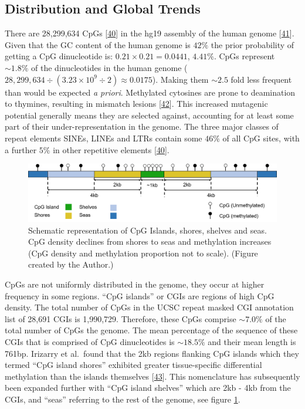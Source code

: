 \documentclass[
]{book}
\begin{document}
\hypertarget{distribution-and-global-trends}{%
\subsection{Distribution and Global Trends}\label{distribution-and-global-trends}}

There are 28,299,634 CpGs {[}\protect\hyperlink{ref-Luo2014}{40}{]} in the hg19 assembly of the human genome {[}\protect\hyperlink{ref-Lander2001}{41}{]}.
Given that the GC content of the human genome is \(42\%\) the prior probability of getting a CpG dinucleotide is: \(0.21 \times 0.21 = 0.0441\), \(4.41\%\).
CpGs represent \(\sim1.8\%\) of the dinucleotides in the human genome ( \(28,299,634 \div (3.23\times10^9\div2) \approx 0.0175\)).
Making them \(\sim2.5\) fold less frequent than would be expected \emph{a priori}.
Methylated cytosines are prone to deamination to thymines, resulting in mismatch lesions {[}\protect\hyperlink{ref-Duncan1980}{42}{]}.
This increased mutagenic potential generally means they are selected against, accounting for at least some part of their under-representation in the genome.
The three major classes of repeat elements SINEs, LINEs and LTRs contain some \(46\%\) of all CpG sites, with a further \(5\%\) in other repetitive elements {[}\protect\hyperlink{ref-Luo2014}{40}{]}.

\begin{figure}

{\centering \includegraphics[width=0.8\linewidth]{figs/CGI-Shores-Shelves-Seas_2} 

}

\caption{Schematic representation of CpG Islands, shores, shelves and seas. CpG density declines from shores to seas and methylation increases (CpG density and methylation proportion not to scale). (Figure created by the Author.)}\label{fig:CGIs}
\end{figure}



CpGs are not uniformly distributed in the genome, they occur at higher frequency in some regions.
``CpG islands'' or CGIs are regions of high CpG density.
The total number of CpGs in the UCSC repeat masked CGI annotation list of 28,691 CGIs is 1,990,729.
Therefore, these CpGs comprise \(\sim7.0\%\) of the total number of CpGs the genome. The mean percentage of the sequence of these CGIs that is comprised of CpG dinucleotides is \(\sim18.5\%\) and their mean length is 761bp.
Irizarry et al.~found that the 2kb regions flanking CpG islands which they termed ``CpG island shores'' exhibited greater tissue-specific differential methylation than the islands themselves {[}\protect\hyperlink{ref-Irizarry2009}{43}{]}.
This nomenclature has subsequently been expanded further with ``CpG island shelves'' which are 2kb - 4kb from the CGIs, and ``seas'' referring to the rest of the genome, see figure \ref{fig:CGIs}.
\end{document}
